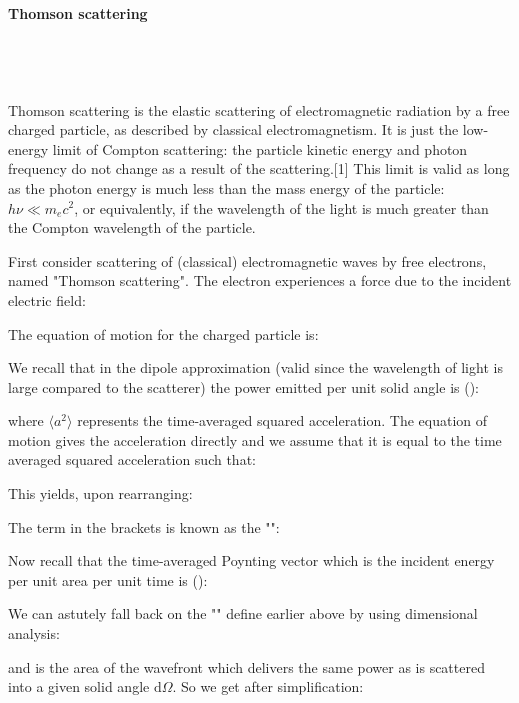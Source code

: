 	\paragraph{Thomson scattering}\mbox{}\\\\\\
	Thomson scattering is the elastic scattering of electromagnetic radiation by a free charged particle, as described by classical electromagnetism. It is just the low-energy limit of Compton scattering: the particle kinetic energy and photon frequency do not change as a result of the scattering.[1] This limit is valid as long as the photon energy is much less than the mass energy of the particle: $h\nu \ll m_ec^{2}$, or equivalently, if the wavelength of the light is much greater than the Compton wavelength of the particle.
	
	First consider scattering of (classical) electromagnetic waves by free electrons, named "Thomson scattering". The electron experiences a force due to the incident electric field:
	
	The equation of motion for the charged particle is:
	
	We recall that in the dipole approximation (valid since the wavelength of light is large compared to the scatterer) the power emitted per unit solid angle\label{solid angle atomic physics} is ():
	
	where $\langle a^2 \rangle$ represents the time-averaged squared acceleration. The equation of motion gives the acceleration directly and we assume that it is equal to the time averaged squared acceleration such that:
	
	This yields, upon rearranging:
	
	The term in the brackets is known as the "":
	
	Now recall that the time-averaged Poynting vector which is the incident energy per unit area per unit time is ():
	
	We can astutely fall back on the "" define earlier above by using dimensional analysis:
	
	and is the area of the wavefront which delivers the same power as is scattered into a given solid angle $\mathrm{d}\Omega$. So we get after simplification:
	
